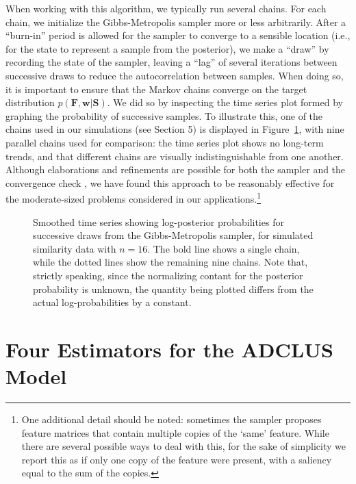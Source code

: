 \documentclass[11pt]{article}
\newcommand{\condon}{|}
\newcommand{\presec}{}
\newcommand{\postsec}{}
\newcommand{\capspace}{}
\begin{document}
When working with this algorithm, we typically run several chains. For each chain, we initialize the Gibbs-Metropolis sampler more or less arbitrarily. After a ``burn-in'' period is allowed for the sampler to converge to a sensible location  (i.e., for the state to represent a sample from the posterior), we make a ``draw'' by recording the state of the sampler, leaving a ``lag'' of several iterations between successive draws to reduce the autocorrelation between samples. When doing so, it is important to ensure that the Markov chains converge on the target distribution $p(\mathbf{F},\mathbf{w}\condon \mathbf{S})$. We did so by inspecting the time series plot formed by graphing the probability of successive samples. To illustrate this, one of the chains used in our simulations (see Section 5) is displayed in Figure~\ref{convergence}, with nine parallel chains used for comparison:  the time series plot shows no long-term trends, and that different chains are visually indistinguishable from one another.  Although elaborations and refinements are possible for both the sampler \cite{chen2000monte} and the convergence check \cite{cowles96}, we have found this approach to be reasonably effective for the moderate-sized problems considered in our applications.\footnote{One additional detail should be noted: sometimes the sampler proposes feature matrices that contain multiple copies of the `same' feature. While there are several possible ways to deal with this, for the sake of simplicity we report this as if only one copy of the feature were present, with a saliency equal to the sum of the copies.}


\begin{figure}
\begin{center}
\caption{\capspace Smoothed time series showing log-posterior probabilities for successive draws from the Gibbs-Metropolis sampler, for simulated similarity data with $n=16$. The bold line shows a single chain, while the dotted lines show the remaining nine chains. Note that, strictly speaking, since the normalizing contant for the posterior probability is unknown, the quantity being plotted differs from the actual log-probabilities by a constant.}
\label{convergence}
\end{center}
\end{figure}


\presec \section{Four Estimators for the ADCLUS Model} \postsec
\end{document}
